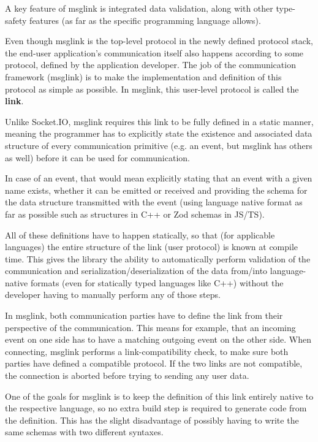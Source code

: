 \documentclass[conference]{IEEEtran}
\begin{document}
A key feature of msglink is integrated data validation, along with other type-safety features (as far as the specific programming language allows).

Even though msglink is the top-level protocol in the newly defined protocol stack, the end-user application's communication itself also happens according to some protocol, defined by the application developer. The job of the communication framework (msglink) is to make the implementation and definition of this protocol as simple as possible. In msglink, this user-level protocol is called the \textbf{link}.

Unlike Socket.IO, msglink requires this link to be fully defined in a static manner, meaning the programmer has to explicitly state the existence and associated data structure of every communication primitive (e.g. an event, but msglink has others as well) before it can be used for communication. 

In case of an event, that would mean explicitly stating that an event with a given name exists, whether it can be emitted or received and providing the schema for the data structure transmitted with the event (using language native format as far as possible such as structures in C++ or Zod schemas in JS/TS). 

All of these definitions have to happen statically, so that (for applicable languages) the entire structure of the link (user protocol) is known at compile time. This gives the library the ability to automatically perform validation of the communication and serialization/deserialization of the data from/into language-native formats (even for statically typed languages like C++) without the developer having to manually perform any of those steps.

In msglink, both communication parties have to define the link from their perspective of the communication. This means for example, that an incoming event on one side has to have a matching outgoing event on the other side. When connecting, msglink performs a link-compatibility check, to make sure both parties have defined a compatible protocol. If the two links are not compatible, the connection is aborted before trying to sending any user data.

One of the goals for msglink is to keep the definition of this link entirely native to the respective language, so no extra build step is required to generate code from the definition. This has the slight disadvantage of possibly having to write the same schemas with two different syntaxes. 
\end{document}
